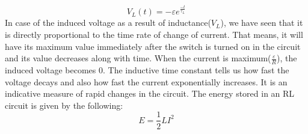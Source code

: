 \documentclass[9pt]{article}
\begin{document}
	$$V_L(t)=-\varepsilon e^{\frac{-t}{\tau_L}}$$
	In case of the induced voltage as a result of inductance($V_L$), we have seen that it is directly proportional to the time rate of change of current. That means, it will have its maximum value immediately after the switch is turned on in the circuit and its value decreases along with time. When the current is maximum($\frac{\varepsilon}{R}$), the induced voltage becomes 0.
	The inductive time constant tells us how fast the voltage decays and also how fast the current exponentially increases. It is an indicative measure of rapid changes in the circuit. The energy stored in an RL circuit is given by the following:
	$$E=\frac{1}{2}LI^2$$
\end{document}
